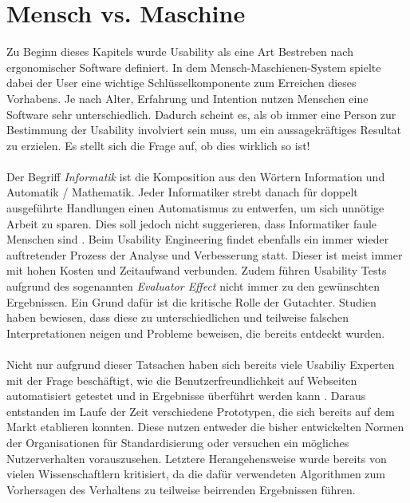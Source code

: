 %
%
%
%

\section{Mensch vs. Maschine}

Zu Beginn dieses Kapitels wurde Usability als eine Art Bestreben nach ergonomischer Software definiert. In dem Mensch-Maschienen-System spielte dabei der User eine wichtige Schlüsselkomponente zum Erreichen dieses Vorhabens. Je nach Alter, Erfahrung und Intention nutzen Menschen eine Software sehr unterschiedlich. Dadurch scheint es, als ob immer eine Person zur Bestimmung der Usability involviert sein muss, um ein aussagekräftiges Resultat zu erzielen. Es stellt sich die Frage auf, ob dies wirklich so ist!\\
\\
Der Begriff \textit{Informatik} ist die Komposition aus den Wörtern Information und Automatik / Mathematik. Jeder Informatiker strebt danach für doppelt ausgeführte Handlungen einen Automatismus zu entwerfen, um sich unnötige Arbeit zu sparen. Dies soll jedoch nicht suggerieren, dass Informatiker faule Menschen sind \cite{lazy}. Beim Usability Engineering findet ebenfalls ein immer wieder auftretender Prozess der Analyse und Verbesserung statt. Dieser ist meist immer mit hohen Kosten und Zeitaufwand verbunden. Zudem führen Usability Tests aufgrund des sogenannten \textit{\glqq Evaluator Effect\grqq{}} \cite{anzahlTestpersonen} nicht immer zu den gewünschten Ergebnissen. Ein Grund dafür ist die kritische Rolle der Gutachter. Studien haben bewiesen, dass diese zu unterschiedlichen und teilweise falschen Interpretationen neigen und Probleme beweisen, die bereits entdeckt wurden.\\
\\
Nicht nur aufgrund dieser Tatsachen haben sich bereits viele Usabiliy Experten mit der Frage beschäftigt, wie die Benutzerfreundlichkeit auf Webseiten automatisiert getestet und in Ergebnisse überführt werden kann \cite{automatisierteUsabilityTests}. Daraus entstanden im Laufe der Zeit verschiedene Prototypen, die sich bereits auf dem Markt etablieren konnten. Diese nutzen entweder die bisher entwickelten Normen der Organisationen für Standardisierung oder versuchen ein mögliches Nutzerverhalten vorauszusehen. Letztere Herangehensweise wurde bereits von vielen Wissenschaftlern kritisiert, da die dafür verwendeten Algorithmen zum Vorhersagen des Verhaltens zu teilweise beirrenden Ergebnissen führen.\\
